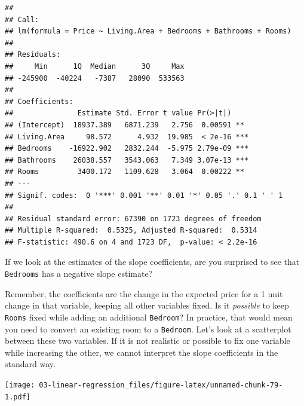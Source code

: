 \documentclass[
]{book}
\newenvironment{Shaded}{\begin{snugshade}}{\end{snugshade}}
\newcommand{\DataTypeTok}[1]{\textcolor[rgb]{0.13,0.29,0.53}{#1}}
\newcommand{\KeywordTok}[1]{\textcolor[rgb]{0.13,0.29,0.53}{\textbf{#1}}}
\newcommand{\NormalTok}[1]{#1}
\newcommand{\OperatorTok}[1]{\textcolor[rgb]{0.81,0.36,0.00}{\textbf{#1}}}
\newcommand{\StringTok}[1]{\textcolor[rgb]{0.31,0.60,0.02}{#1}}
\begin{document}
\begin{verbatim}
## 
## Call:
## lm(formula = Price ~ Living.Area + Bedrooms + Bathrooms + Rooms)
## 
## Residuals:
##     Min      1Q  Median      3Q     Max 
## -245900  -40224   -7387   28090  533563 
## 
## Coefficients:
##               Estimate Std. Error t value Pr(>|t|)    
## (Intercept)  18937.389   6871.239   2.756  0.00591 ** 
## Living.Area     98.572      4.932  19.985  < 2e-16 ***
## Bedrooms    -16922.902   2832.244  -5.975 2.79e-09 ***
## Bathrooms    26038.557   3543.063   7.349 3.07e-13 ***
## Rooms         3400.172   1109.628   3.064  0.00222 ** 
## ---
## Signif. codes:  0 '***' 0.001 '**' 0.01 '*' 0.05 '.' 0.1 ' ' 1
## 
## Residual standard error: 67390 on 1723 degrees of freedom
## Multiple R-squared:  0.5325,	Adjusted R-squared:  0.5314 
## F-statistic: 490.6 on 4 and 1723 DF,  p-value: < 2.2e-16
\end{verbatim}

If we look at the estimates of the slope coefficients, are you surprised to see that \texttt{Bedrooms} has a negative slope estimate?

Remember, the coefficients are the change in the expected price for a 1 unit change in that variable, keeping all other variables fixed. Is it \emph{possible} to keep \texttt{Rooms} fixed while adding an additional \texttt{Bedroom}? In practice, that would mean you need to convert an existing room to a \texttt{Bedroom}. Let's look at a scatterplot between these two variables. If it is not realistic or possible to fix one variable while increasing the other, we cannot interpret the slope coefficients in the standard way.

\begin{Shaded}
\end{Shaded}

\texttt{[image: 03-linear-regression\_files/figure-latex/unnamed-chunk-79-1.pdf]}

\begin{Shaded}
\end{Shaded}
\end{document}
